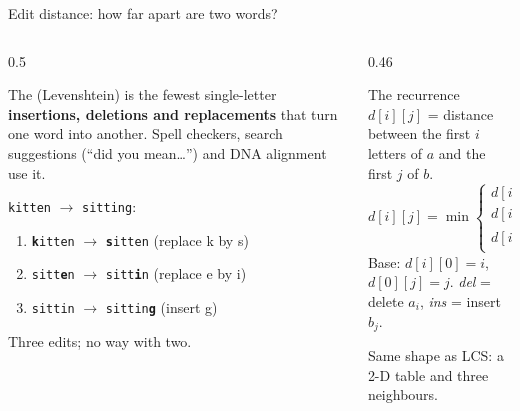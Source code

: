 \documentclass[aspectratio=169,10pt]{beamer}
\begin{document}
\begin{frame}{Edit distance: how far apart are two words?}
\begin{columns}[T]
\begin{column}{0.5\textwidth}
{\small
The  (Levenshtein) is the fewest single-letter \textbf{insertions, deletions and replacements} that turn one word into another. Spell checkers, search suggestions (``did you mean\ldots'') and DNA alignment use it.

\vspace{2mm}
\texttt{kitten} $\to$ \texttt{sitting}:
\begin{enumerate}\setlength\itemsep{1pt}
\item \texttt{\textbf{k}itten} $\to$ \texttt{\textbf{s}itten} (replace k by s)
\item \texttt{sitt\textbf{e}n} $\to$ \texttt{sitt\textbf{i}n} (replace e by i)
\item \texttt{sittin} $\to$ \texttt{sittin\textbf{g}} (insert g)
\end{enumerate}
Three edits; no way with two.}
\end{column}
\begin{column}{0.46\textwidth}
\begin{block}{The recurrence}
{\small $d[i][j]$ = distance between the first $i$ letters of $a$ and the first $j$ of $b$.
{\footnotesize\[
d[i][j]=\min\begin{cases}
d[i-1][j]+1 & \text{del}\\
d[i][j-1]+1 & \text{ins}\\
d[i-1][j-1]+[a_i\ne b_j] & \text{sub}
\end{cases}\]}
Base: $d[i][0]=i$, $d[0][j]=j$. \emph{del} = delete $a_i$, \emph{ins} = insert $b_j$.}
\end{block}
\vspace{1mm}
{\small Same shape as LCS: a 2-D table and three neighbours.}
\end{column}
\end{columns}
\end{frame}
\end{document}
